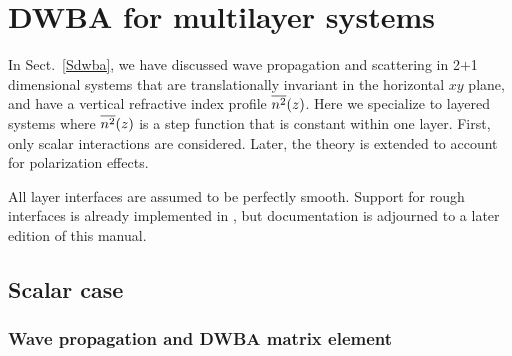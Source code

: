 

\chapter{DWBA for multilayer systems}  \label{sec:Multilayers}


%

In Sect.~\ref{Sdwba},
we have discussed wave propagation and scattering in 2$+$1 dimensional systems
that are translationally invariant in the horizontal $xy$ plane,
and have a vertical refractive index profile $\overline{n^2}(z)$.
Here we specialize to layered systems
where $\overline{n^2}(z)$ is a step function that is constant within one layer.
First, only scalar interactions are considered.
Later, the theory is extended to account for polarization effects.


All layer interfaces are assumed to be perfectly smooth.
Support for rough interfaces is already implemented in \BornAgain,
but documentation is adjourned to a later edition of this manual.

\section{Scalar case}

\subsection{Wave propagation and DWBA matrix element}

